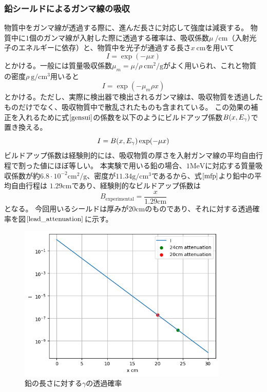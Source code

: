\documentclass[dvipdfmx]{jreport}
\begin{document}
\subsubsection{鉛シールドによるガンマ線の吸収}
物質中をガンマ線が透過する際に、進んだ長さに対応して強度は減衰する。
物質中に$1$個のガンマ線が入射した際に透過する確率は、吸収係数$\mu\ \mathrm{/cm}$（入射光子のエネルギーに依存）と、物質中を光子が通過する長さ$x\ \mathrm{cm}$を用いて
\begin{equation}
  \label{gensui}
  I = \exp(- \mu x)
\end{equation}
とかける。一般には質量吸収係数$\mu_{m} = \mu / \rho\ \mathrm{cm^{2}/g}$がよく用いられ、これと物質の密度$\rho\ \mathrm{g/cm^3}$用いると
\begin{equation}
  I = \exp(- \mu_{m} \rho x)  
\end{equation}
とかける。ただし、実際に検出器で検出されるガンマ線は、吸収物質を透過したものだけでなく、吸収物質中で散乱されたものも含まれている。
この効果の補正を入れるために式$\ref{gensui}$の係数を以下のようにビルドアップ係数$B\qty(x,E_{\gamma})$で置き換える。
\begin{equation}
  I = B\qty(x,E_{\gamma})\exp(- \mu x)
\end{equation}
ビルドアップ係数は経験則的には、吸収物質の厚さを入射ガンマ線の平均自由行程で割った値にほぼ等しい。
本実験で用いる鉛の場合、$1\mathrm{MeV}$に対応する質量吸収係数が約$6.8 \cdot 10^{-2} \mathrm{cm^{2}/g}$、密度が$11.34 \mathrm{g/cm^{3}}$であるから、式$\ref{mfp}$より鉛中の平均自由行程は
$1.29\mathrm{cm}$であり、経験則的なビルドアップ係数は
\begin{equation}
  B_{\mathrm{experimental}} = \frac{x}{1.29\mathrm{cm}}
\end{equation}
となる。
今回用いるシールドは厚みが$20\mathrm{cm}$のものであり、それに対する透過確率を図$\ref{lead_attenuation}$に示す。
\begin{figure}[htbp]
  \begin{center}
    \includegraphics[width=100mm]{figure/lead_attenuation.png}
    \caption{鉛の長さに対する$\gamma$の透過確率 \label{lead_attenuation}}
  \end{center}
\end{figure}
\end{document}
